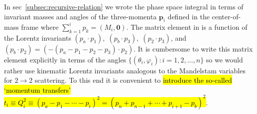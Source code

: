 In sec~\ref{subsec:recursive-relation} we wrote the phase space integral in terms of invariant masses and angles of the three-momenta $\bm{p}_i$ defined in the center-of-mass frame where $\sum_{k=1}^{i} p_k = (M_{i}, \bm{0})$. 
The matrix element in  is a function of the Lorentz invariants $(p_a \cdot p_1), \; (p_b \cdot p_3), \; (p_2 \cdot p_3)$, and $(p_b \cdot p_2) = (- (p_a - p_1 - p_2 - p_3) \cdot p_2)$. 
It is cumbersome to write this matrix element explicitly in terms of the angles $\{ (\theta_i, \varphi_i) : i = 1, 2, \ldots, n\}$ so we would rather use kinematic Lorentz invariants analogous to the Mandelstam variables for $2 \rightarrow 2$ scattering.
To this end it is convenient to \hl{introduce the so-called `momentum transfers' $t_i \equiv Q_i^2 \equiv (p_a - p_1 - \cdots - p_i)^2 = (p_n + p_{n-1} + \cdots + p_{i + 1} - p_b)^2$}.

